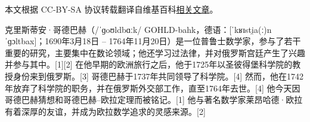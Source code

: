 
本文根据 CC-BY-SA 协议转载翻译自维基百科\href{https://en.wikipedia.org/wiki/Christian_Goldbach}{相关文章}。

克里斯蒂安·哥德巴赫（/ˈɡoʊldbɑːk/ GOHLD-bahk，德语：[ˈkʁɪsti̯a(ː)n ˈɡɔltbax]；1690年3月18日 – 1764年11月20日）是一位普鲁士数学家，参与了若干重要的研究，主要集中在数论领域；他还学习过法律，并对俄罗斯宫廷产生了兴趣并参与其中。[1][2] 在他早期的欧洲旅行之后，他于1725年以圣彼得堡科学院的教授身份来到俄罗斯。[3] 哥德巴赫于1737年共同领导了科学院。[4] 然而，他在1742年放弃了科学院的职务，并在俄罗斯外交部工作，直至1764年去世。[4] 他今天因哥德巴赫猜想和哥德巴赫–欧拉定理而被铭记。[1] 他与著名数学家莱昂哈德·欧拉有着深厚的友谊，并成为欧拉数学追求的灵感来源。[2]
